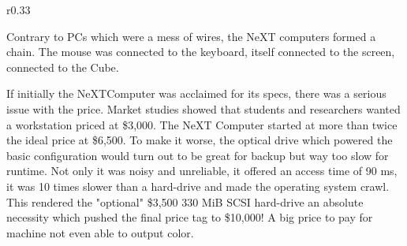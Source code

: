 \begin{wrapfigure}[9]{r}{0.33\textwidth}
\centering
{}
\end{wrapfigure}


Contrary to PCs which were a mess of wires, the NeXT computers formed a chain. The mouse was connected to the keyboard, itself connected to the screen, connected to the Cube.\\


\par


If initially the NeXTComputer was acclaimed for its specs, there was a serious issue with the price. Market studies showed that students and researchers wanted a workstation priced at \$3,000. The NeXT Computer started at more than twice the ideal price at \$6,500. To make it worse, the optical drive which powered the basic configuration would turn out to be great for backup but way too slow for runtime. Not only it was noisy and unreliable, it offered an access time of 90 ms, it was 10 times slower than a hard-drive and made the operating system crawl. This rendered the "optional" \$3,500 330 MiB SCSI hard-drive an absolute necessity which pushed the final price tag to \$10,000! A big price to pay for machine not even able to output color.\\
\par





